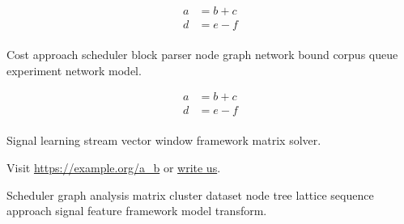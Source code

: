 \documentclass[twocolumn]{book}
\theoremstyle{definition}
\theoremstyle{remark}
\begin{document}
\begin{align}
a &= b + c \\
d &= e - f \\
\end{align}

Cost approach scheduler block parser node graph network bound corpus queue experiment network model.

\begin{align}
a &= b + c \\
d &= e - f \\
\end{align}

Signal learning stream vector window framework matrix solver.

Visit \url{https://example.org/a_b} or \href{mailto:a@example.org}{write us}.

Scheduler graph analysis matrix cluster dataset node tree lattice sequence approach signal feature framework model transform.
\end{document}
